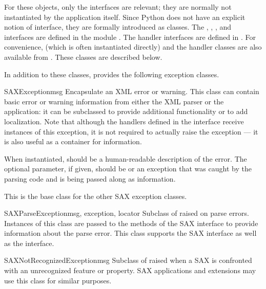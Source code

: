 For these objects, only the interfaces are relevant; they are normally
not instantiated by the application itself. Since Python does not have
an explicit notion of interface, they are formally introduced as
classes. The , ,
, and  interfaces are defined
in the module . The handler interfaces
are defined in . For convenience,
 (which is often instantiated directly) and the
handler classes are also available from .  These
classes are described below.

In addition to these classes,  provides the following
exception classes.

\begin{excclassdesc}{SAXException}{msg}
  Encapsulate an XML error or warning.  This class can contain basic
  error or warning information from either the XML parser or the
  application: it can be subclassed to provide additional
  functionality or to add localization.  Note that although the
  handlers defined in the  interface receive
  instances of this exception, it is not required to actually raise
  the exception --- it is also useful as a container for information.

  When instantiated,  should be a human-readable description
  of the error.  The optional  parameter, if given,
  should be  or an exception that was caught by the parsing
  code and is being passed along as information.

  This is the base class for the other SAX exception classes.
\end{excclassdesc}

\begin{excclassdesc}{SAXParseException}{msg, exception, locator}
  Subclass of  raised on parse errors.
  Instances of this class are passed to the methods of the SAX
   interface to provide information about the
  parse error.  This class supports the SAX  interface
  as well as the  interface.
\end{excclassdesc}

\begin{excclassdesc}{SAXNotRecognizedException}{msg}
  Subclass of  raised when a SAX
   is confronted with an unrecognized feature or
  property.  SAX applications and extensions may use this class for
  similar purposes.
\end{excclassdesc}

